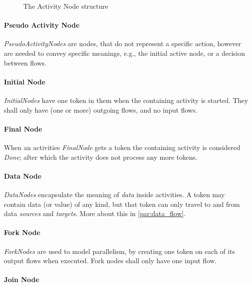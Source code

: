 \begin{figure}[!ht]
	\centering
	
	\caption{The Activity Node structure}
	\label{fig:activity_nodes}
\end{figure}

\paragraph{Pseudo Activity Node}

\emph{PseudoActivityNodes} are nodes, that do not represent a specific action, however are needed to convey specific meanings, e.g., the initial active node, or a decision between flows.

\paragraph{Initial Node}

\emph{InitialNodes} have one token in them when the containing activity is started. They shall only have (one or more) outgoing flows, and no input flows. 

\paragraph{Final Node}

When an activities \emph{FinalNode} gets a token the containing activity is considered \emph{Done}; after which the activity does not process any more tokens.

\paragraph{Data Node}

\emph{DataNodes} encapsulate the meaning of \emph{data} inside activities. A token may contain data (or value) of any kind, but that token can only travel to and from data \emph{sources} and \emph{targets}. More about this in \autoref{par:data_flow}.

\paragraph{Fork Node}

\emph{ForkNodes} are used to model parallelism, by creating one token on each of its output flows when executed. Fork nodes shall only have one input flow.

\paragraph{Join Node}


